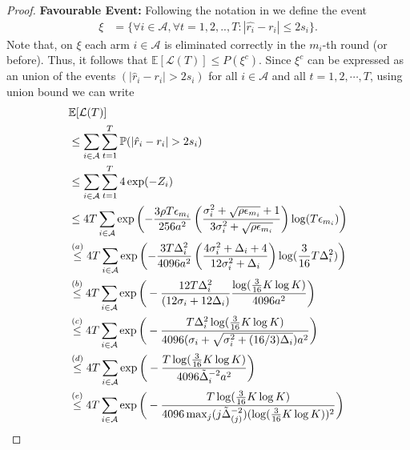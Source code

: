\begin{proof}
  


\textbf{Favourable Event:} Following the notation in \cite{locatelli2016optimal} we define the event
\begin{align*}
\xi&=\bigg\lbrace \forall i\in \mathcal{A}, \forall t=1,2,..,T: |\hat{r_i} - r_i| \leq  2s_i\bigg\rbrace.
\end{align*}
Note that, on $\xi$ each arm $i\in \mathcal{A}$  is eliminated correctly in the $m_i$-th round (or before). Thus, it follows that $\mathbb{E}[\mathcal{L}(T)]\le P(\xi^c)$. Since $\xi^c$ can be expressed as an union of the events $(|\hat{r}_i-r_i|>2s_i)$ for all $i\in\mathcal{A}$ and all $t=1,2,\cdots,T$, using union bound we can write
\begin{align*}
&\mathbb{E}[\mathcal{L}(T)] \\
&\le \sum_{i\in\mathcal{A}}\sum_{t=1}^T \Pb(|\hat{r}_i-r_i|>2s_i) \\
&\le \sum_{i\in\mathcal{A}}\sum_{t=1}^T 4 \exp(-Z_i) \\
&\le 4T\sum_{i\in\mathcal{A}} \exp\left(- \dfrac{3\rho T\epsilon_{m_i}}{256 a^2} \left(\dfrac{\sigma_{i}^{2}+\sqrt{\rho\epsilon_{m_{i}}}+1}{3\sigma_{i}^{2}+\sqrt{\rho \epsilon_{m_{i}}}}\right) \log( T\epsilon_{m_{i}}) \right) \\
&\overset{(a)}{\le} 4T \sum_{i\in\mathcal{A}} \exp\left(- \frac{3T\Delta_{i}^{2}}{4096 a^2} \left(\frac{4\sigma_{i}^{2}+\Delta_{i}+4}{12\sigma_{i}^{2}+\Delta_{i}}\right) \log( \frac{3}{16} T\Delta_{i}^{2}) \right) \\
&\overset{(b)}{\le} 4T \sum_{i\in\mathcal{A}}\exp\bigg(- \frac{12T\Delta_{i}^{2}}{(12\sigma_{i}+ 12\Delta_{i})}\frac{\log (\frac{3}{16} K\log K)}{4096 a^2 } \bigg) \\
&\overset{(c)}{\le} 4T \sum_{i\in\mathcal{A}} \exp\bigg(- \frac{T\Delta_{i}^{2}\log ( \frac{3}{16} K\log K)}{4096 (\sigma_{i} + \sqrt{\sigma_{i}^{2} + (16/3)\Delta_{i}}) a^2} \bigg) \\
& \overset{(d)}{\le} 4T \sum_{i\in\mathcal{A}} \exp\bigg(- \frac{T\log ( \frac{3}{16} K\log K)}{4096 \tilde{\Delta}_i^{-2} a^2} \bigg) \\
& \overset{(e)}{\le}4T \sum_{i\in\mathcal{A}} \exp\bigg(- \frac{T\log ( \frac{3}{16} K\log K)}{4096 \max_{j}(j\tilde{\Delta}_{(j)}^{-2}) (\log(\frac{3}{16} K\log K))^{2}} \bigg) \\

\end{align*}
\end{proof}
